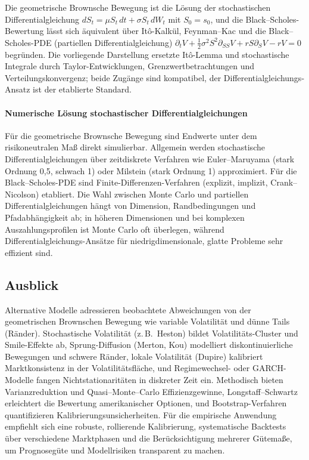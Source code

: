 Die geometrische Brownsche Bewegung ist die Lösung der stochastischen Differentialgleichung
$dS_t=\mu S_t\,dt+\sigma S_t\,dW_t$ mit $S_0=s_0$,
und die Black–Scholes-Bewertung lässt sich äquivalent über It\^o-Kalkül, Feynman–Kac und die Black–Scholes-PDE (partiellen Differentialgleichung)
$\partial_t V+\tfrac12\sigma^2 S^2 \partial_{SS}V + r S \partial_S V - r V=0$
begründen. Die vorliegende Darstellung ersetzte It\^o-Lemma und stochastische Integrale durch Taylor-Entwicklungen, Grenzwertbetrachtungen und 
Verteilungskonvergenz; beide Zugänge sind kompatibel, der Differentialgleichungs-Ansatz ist der etablierte Standard. 

\paragraph{Numerische Lösung stochastischer Differentialgleichungen}
Für die geometrische Brownsche Bewegung sind Endwerte unter dem risikoneutralen Maß direkt simulierbar. Allgemein werden stochastische Differentialgleichungen über 
zeitdiskrete Verfahren wie Euler–Maruyama (stark Ordnung 0{,}5, schwach 1) oder 
Milstein (stark Ordnung 1) approximiert. Für die Black–Scholes-PDE sind 
Finite-Differenzen-Verfahren (explizit, implizit, Crank–Nicolson) etabliert. Die Wahl zwischen 
Monte Carlo und partiellen Differentialgleichungen hängt von Dimension, Randbedingungen und Pfadabhängigkeit ab; in höheren 
Dimensionen und bei komplexen Auszahlungsprofilen ist Monte Carlo oft überlegen, während 
Differentialgleichungs-Ansätze für niedrigdimensionale, glatte Probleme sehr effizient sind.

\subsection{Ausblick}

Alternative Modelle adressieren beobachtete Abweichungen von der geometrischen Brownschen Bewegung wie variable Volatilität
und dünne Tails (Ränder). Stochastische Volatilität (z.\,B.\ Heston) bildet Volatilitäts-Cluster und 
Smile-Effekte ab, Sprung-Diffusion (Merton, Kou) modelliert diskontinuierliche Bewegungen und 
schwere Ränder, lokale Volatilität (Dupire) kalibriert Marktkonsistenz in der Volatilitätsfläche,
und Regimewechsel- oder GARCH-Modelle fangen Nichtstationaritäten in diskreter Zeit ein. 
Methodisch bieten Varianzreduktion und Quasi–Monte–Carlo Effizienzgewinne, Longstaff–Schwartz 
erleichtert die Bewertung amerikanischer Optionen, und Bootstrap-Verfahren 
quantifizieren Kalibrierungsunsicherheiten. Für die empirische Anwendung empfiehlt sich eine 
robuste, rollierende Kalibrierung, systematische Backtests über verschiedene Marktphasen und die 
Berücksichtigung mehrerer Gütemaße, um Prognosegüte und Modellrisiken transparent zu machen.